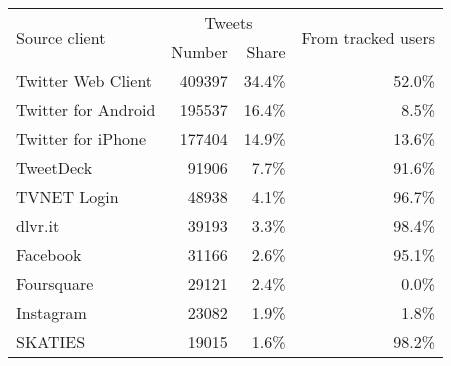 \begin{tabular}{lrrr}
  \toprule
  \multirow{2}{*}{Source client} & \multicolumn{2}{c}{Tweets} & \multirow{2}{*}{From tracked users} \\
  \cmidrule(r){2-3} %
  {} &  Number & Share & {} \\
  \midrule
  Twitter Web Client  &       409397 &       34.4\% &                52.0\% \\
  Twitter for Android &       195537 &       16.4\% &                 8.5\% \\
  Twitter for iPhone  &       177404 &       14.9\% &                13.6\% \\
  TweetDeck           &        91906 &        7.7\% &                91.6\% \\
  TVNET Login         &        48938 &        4.1\% &                96.7\% \\
  dlvr.it             &        39193 &        3.3\% &                98.4\% \\
  Facebook            &        31166 &        2.6\% &                95.1\% \\
  Foursquare          &        29121 &        2.4\% &                 0.0\% \\
  Instagram           &        23082 &        1.9\% &                 1.8\% \\
  SKATIES             &        19015 &        1.6\% &                98.2\% \\
  \bottomrule
\end{tabular}
